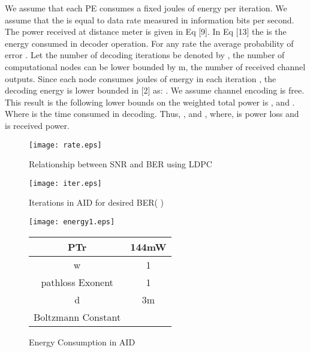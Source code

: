 \documentclass[3p,times,procedia]{elsarticle}
\begin{document}
We assume that each PE consumes a fixed  joules of energy per iteration. We assume that the  is equal to data rate   measured in information bits per second.
The power received at distance  meter is given in Eq [9].
In Eq [13] the  is the energy consumed in decoder operation.
For any rate  the average probability of error .
Let the number of decoding iterations be denoted by , the number of computational nodes can be lower bounded by m, the number of received channel outputs.
Since each node consumes  joules of energy in each iteration , the decoding energy  is lower bounded in [2] as:
. We assume channel encoding is free. This result is the following lower bounds on the weighted total power is , and . Where  is the time consumed in decoding. Thus,
, and , where,  is power loss and  is received power.

  \begin{figure}[!ht]
    \begin{minipage}{0.49\linewidth}
    \texttt{[image: rate.eps]}
    \vspace{-0.5cm}
    \caption{Relationship between SNR and BER using LDPC}
    \end{minipage}
\begin{minipage}{0.49\linewidth}
    \texttt{[image: iter.eps]}
    \vspace{-0.5cm}
    \caption{Iterations in AID for desired BER(  )}
    \end{minipage}
\begin{minipage}{0.49\linewidth}
    \texttt{[image: energy1.eps]}
    \vspace{-0.5cm}
    \caption{Energy Consumption in AID}
    \end{minipage}
    \hspace{1cm}
    \begin{minipage}{0.49\linewidth}
\centering
    \scriptsize
\begin{tabular}{|c|c|}
\hline
       PTr &      144mW \\
\hline

         w &          1 \\
\hline

pathloss Exonent &          1 \\
\hline

         d &             3m \\
\hline

Boltzmann Constant &  \\
\hline


\end{tabular}
\end{minipage}
\end{figure}
\end{document}
